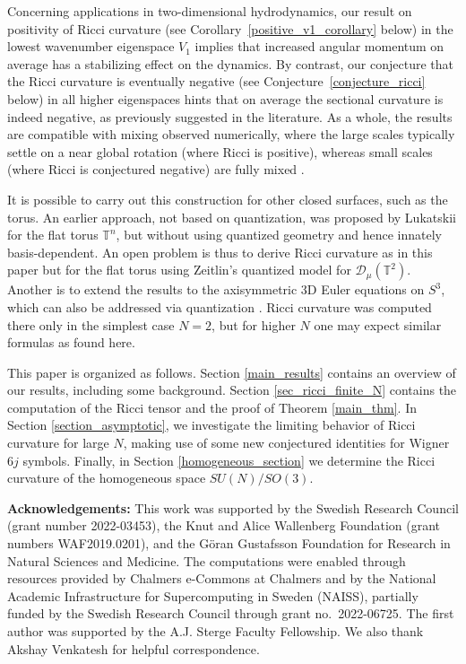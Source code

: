 \documentclass[11pt]{amsart}
\numberwithin{equation}{section}
\theoremstyle{definition}
\newcommand{\Diff}{\mathcal{D}}
\begin{document}
Concerning applications in two-dimensional hydrodynamics, our result on positivity of Ricci curvature (see Corollary~\ref{positive_v1_corollary} below) in the lowest wavenumber eigenspace $V_1$ implies that increased angular momentum on average has a stabilizing effect on the dynamics. By contrast, our conjecture that the Ricci curvature is eventually negative (see Conjecture~\ref{conjecture_ricci} below) in all higher eigenspaces hints that on average the sectional curvature is indeed negative, as previously suggested in the literature. 
As a whole, the results are compatible with mixing observed numerically, where the large scales typically settle on a near global rotation (where Ricci is positive), whereas small scales (where Ricci is conjectured negative) are fully mixed \cite{MoVi2020}.

It is possible to carry out this construction for other closed surfaces, such as the torus. An earlier approach, not based on quantization, was proposed by Lukatskii \cite{lukatskii1984curvature} for the flat torus $\mathbb{T}^n$, but without using quantized geometry and hence innately basis-dependent. 
An open problem is thus to derive Ricci curvature as in this paper but for the flat torus  using Zeitlin's quantized model for $\Diff_{\mu}(\mathbb{T}^2)$. 
Another is to extend the results to the axisymmetric 3D Euler equations on $S^3$, which can also be addressed via quantization \cite{MoPr2025}. Ricci curvature was computed there only in the simplest case $N=2$, but for higher $N$ one may expect similar formulas as found here.


This paper is organized as follows. Section \ref{main_results} contains an overview of our  results, including some background.
Section \ref{sec_ricci_finite_N} contains the computation of the Ricci tensor and the proof of Theorem \ref{main_thm}. In Section \ref{section_asymptotic}, we investigate the limiting behavior of Ricci curvature for large $N$, making use of some new conjectured identities for Wigner $6j$ symbols. Finally, in Section \ref{homogeneous_section} we determine the Ricci curvature of the homogeneous space $SU(N)/SO(3)$.





\textbf{Acknowledgements:}
This work was supported by the Swedish Research Council (grant number 2022-03453), the Knut and Alice Wallenberg Foundation (grant numbers WAF2019.0201), and the Göran Gustafsson Foundation for Research in Natural Sciences and Medicine.
The computations were enabled through resources provided by Chalmers e-Commons at Chalmers and by the National Academic Infrastructure for Supercomputing in Sweden (NAISS), partially funded by the Swedish Research Council through grant no.~2022-06725. The first author was supported by the A.J. Sterge Faculty Fellowship. We also thank Akshay Venkatesh for helpful correspondence.
\end{document}
